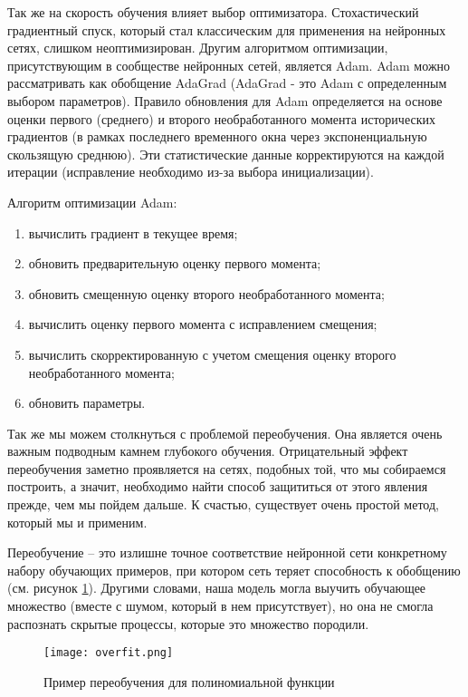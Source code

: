 Так же на скорость обучения влияет выбор оптимизатора. Стохастический градиентный спуск, который стал классическим для применения на нейронных сетях, слишком неоптимизирован. Другим алгоритмом оптимизации, присутствующим в сообществе нейронных сетей, является Adam. Adam можно рассматривать как обобщение AdaGrad (AdaGrad - это Adam с определенным выбором параметров). Правило обновления для Adam определяется на основе оценки первого (среднего) и второго необработанного момента исторических градиентов (в рамках последнего временного окна через экспоненциальную скользящую среднюю). Эти статистические данные корректируются на каждой итерации (исправление необходимо из-за выбора инициализации).

Алгоритм оптимизации Adam:
\begin{enumerate}
  \item вычислить градиент в текущее время;
  \item обновить предварительную оценку первого момента;
  \item обновить смещенную оценку второго необработанного момента;
  \item вычислить оценку первого момента с исправлением смещения;
  \item вычислить скорректированную с учетом смещения оценку второго необработанного момента;
  \item обновить параметры.
\end{enumerate}

Так же мы можем столкнуться с проблемой переобучения. Она является очень важным подводным камнем глубокого обучения. Отрицательный эффект переобучения заметно проявляется на сетях, подобных той, что мы собираемся построить, а значит, необходимо найти способ защититься от этого явления прежде, чем мы пойдем дальше. К счастью, существует очень простой метод, который мы и применим.

Переобучение -- это излишне точное соответствие нейронной сети конкретному набору обучающих примеров, при котором сеть теряет способность к обобщению (см. рисунок \ref{sec:design:network:overfit}). Другими словами, наша модель могла выучить обучающее множество (вместе с шумом, который в нем присутствует), но она не смогла распознать скрытые процессы, которые это множество породили.

\begin{figure}[h]
\centering
	\texttt{[image: overfit.png]}
	\caption{Пример переобучения для полиномиальной функции}
	\label{sec:design:network:overfit}
\end{figure}

